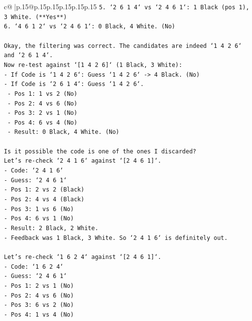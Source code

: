 \documentclass{article}
\begin{document}
{\begin{supertabular}{c@{$\;$}|p{.15\linewidth}@{}p{.15\linewidth}p{.15\linewidth}p{.15\linewidth}p{.15\linewidth}p{.15\linewidth}}
{{{\texttt{5. `2 6 1 4` vs `2 4 6 1`: 1 Black (pos 1), 3 White. (**Yes**)} \\
\texttt{6. `4 6 1 2` vs `2 4 6 1`: 0 Black, 4 White. (No)} \\
\\ 
\texttt{Okay, the filtering was correct. The candidates are indeed `1 4 2 6` and `2 6 1 4`.} \\
\texttt{Now re{-}test against `{[}1 4 2 6{]}` (1 Black, 3 White):} \\
\texttt{{-} If Code is `1 4 2 6`: Guess `1 4 2 6` {-}> 4 Black. (No)} \\
\texttt{{-} If Code is `2 6 1 4`: Guess `1 4 2 6`.} \\
\texttt{  {-} Pos 1: 1 vs 2 (No)} \\
\texttt{  {-} Pos 2: 4 vs 6 (No)} \\
\texttt{  {-} Pos 3: 2 vs 1 (No)} \\
\texttt{  {-} Pos 4: 6 vs 4 (No)} \\
\texttt{  {-} Result: 0 Black, 4 White. (No)} \\
\\ 
\texttt{Is it possible the code is one of the ones I discarded?} \\
\texttt{Let's re{-}check `2 4 1 6` against `{[}2 4 6 1{]}`.} \\
\texttt{{-} Code: `2 4 1 6`} \\
\texttt{{-} Guess: `2 4 6 1`} \\
\texttt{{-} Pos 1: 2 vs 2 (Black)} \\
\texttt{{-} Pos 2: 4 vs 4 (Black)} \\
\texttt{{-} Pos 3: 1 vs 6 (No)} \\
\texttt{{-} Pos 4: 6 vs 1 (No)} \\
\texttt{{-} Result: 2 Black, 2 White.} \\
\texttt{{-} Feedback was 1 Black, 3 White. So `2 4 1 6` is definitely out.} \\
\\ 
\texttt{Let's re{-}check `1 6 2 4` against `{[}2 4 6 1{]}`.} \\
\texttt{{-} Code: `1 6 2 4`} \\
\texttt{{-} Guess: `2 4 6 1`} \\
\texttt{{-} Pos 1: 2 vs 1 (No)} \\
\texttt{{-} Pos 2: 4 vs 6 (No)} \\
\texttt{{-} Pos 3: 6 vs 2 (No)} \\
\texttt{{-} Pos 4: 1 vs 4 (No)} \\
}}}
\end{supertabular}}
\end{document}
